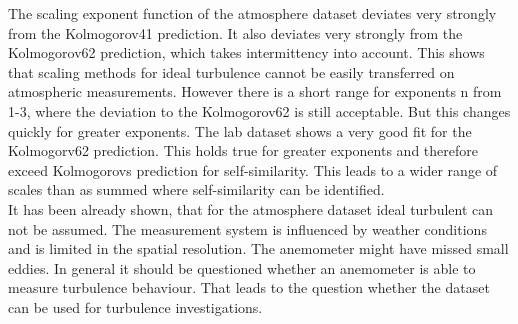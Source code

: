 \documentclass[12pt]{article}
\begin{document}
The scaling exponent function of the atmosphere dataset deviates very strongly from the Kolmogorov41 prediction. It also deviates very strongly from the Kolmogorov62 prediction, which takes intermittency into account. This shows that scaling methods for ideal turbulence cannot be easily transferred on atmospheric measurements. However there is a short range for exponents n from 1-3, where the deviation to the Kolmogorov62 is still acceptable. But this changes quickly for greater exponents.
The lab dataset shows a very good fit for the Kolmogorv62 prediction. This holds true for greater exponents and therefore exceed Kolmogorovs prediction for self-similarity. This leads to a wider range of scales than as summed where self-similarity can be identified. \\
It has been already shown, that for the atmosphere dataset ideal turbulent can not be assumed. The measurement system is influenced by weather conditions and is limited in the spatial resolution. The anemometer might have missed small eddies. In general it should be questioned whether an anemometer is able to measure turbulence behaviour. That leads to the question whether the dataset can be used for turbulence investigations.
\end{document}
